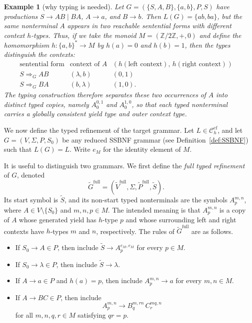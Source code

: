 \documentclass[11pt,a4paper]{article}
\newtheorem{example}[theorem]{Example}
\newcommand{\cf}{\mathrm{cf}}
\newcommand{\Ccf}[1]{\mathcal C_{#1}^{\cf}}
\begin{document}
\begin{example}[why typing is needed]\label{ex:typing-motivation}
Let $G=(\{S,A,B\},\{a,b\},P,S)$ have productions
$S\to AB\mid BA$, $A\to a$, and $B\to b$. Then $L(G)=\{ab,ba\}$, but
the same nonterminal $A$ appears in two reachable sentential forms with
different context $h$-types. Thus, if we take the monoid
$M=(\mathbb{Z}/2\mathbb{Z},+,0)$ and define the homomorphism
$h:\{a,b\}^*\to M$ by $h(a)=0$ and $h(b)=1$, then the types distinguish
the contexts:
\[
\begin{array}{c|c|c}
\text{sentential form} & \text{context of $A$} &
(h(\text{left context}),\,h(\text{right context}))\\\hline
S\Rightarrow_G AB & (\lambda,b) & (0,1)\\
S\Rightarrow_G BA & (b,\lambda) & (1,0).
\end{array}
\]
The typing construction therefore separates these two occurrences of
$A$ into distinct typed copies, namely $A_0^{0,1}$ and $A_0^{1,0}$, so
that each typed nonterminal carries a globally consistent yield type and
outer context type.
\end{example}

We now define the typed refinement of the target grammar. Let
$L\in\Ccf{h}$, and let $G=(V,\Sigma,P,S_0)$ be any reduced SSBNF grammar
(see Definition~\ref{def:SSBNF}) such that $L(G)=L$. Write $e_M$ for the
identity element of $M$.

It is useful to distinguish two grammars. We first define the
\emph{full typed refinement} of $G$, denoted
\[
  \widetilde G^{\mathrm{full}}
  =
  (\widetilde V^{\mathrm{full}},\Sigma,
   \widetilde P^{\mathrm{full}},\widetilde S).
\]
Its start symbol is $\widetilde S$, and its non-start typed
nonterminals are the symbols $A_p^{m,n}$, where
$A\in V\setminus\{S_0\}$ and $m,n,p\in M$. The intended meaning is that
$A_p^{m,n}$ is a copy of $A$ whose generated yield has $h$-type $p$ and
whose surrounding left and right contexts have $h$-types $m$ and $n$,
respectively. The rules of $\widetilde G^{\mathrm{full}}$ are as
follows.
\begin{itemize}[nosep,leftmargin=2.2em]
\item If $S_0\to A\in P$, then include
$\widetilde S\to A_p^{e_M,e_M}$ for every $p\in M$.
\item If $S_0\to\lambda\in P$, then include
$\widetilde S\to\lambda$.
\item If $A\to a\in P$ and $h(a)=p$, then include
$A_p^{m,n}\to a$ for every $m,n\in M$.
\item If $A\to BC\in P$, then include
\[
  A_p^{m,n}\to B_q^{m,rn}\,C_r^{mq,n}
\]
for all $m,n,q,r\in M$ satisfying $qr=p$.
\end{itemize}
\end{document}
